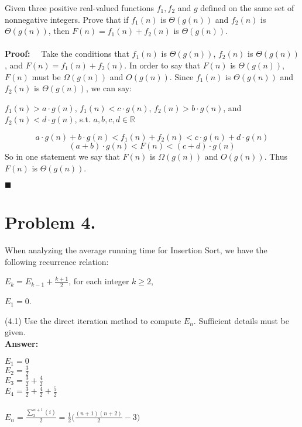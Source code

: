 \documentclass[11pt]{article}
\begin{document}
Given three positive real-valued functions $f_1,f_2$ and $g$ defined on the
same set of nonnegative integers.  Prove that if
$f_1(n)$ is $\Theta(g(n))$ and $f_2(n)$ is $\Theta(g(n))$, then
$F(n)=f_1(n)+f_2(n)$ is $\Theta(g(n))$.\\\\
\noindent
{\bf Proof:}~~ 
\newline
Take the conditions that $f_1(n)$ is $\Theta(g(n))$, $f_2(n)$ is $\Theta(g(n))$, and $F(n) = f_1(n) + f_2(n)$. In order to say that $F(n)$ is $\Theta(g(n))$, $F(n)$ must be $\Omega(g(n))$ and $O(g(n))$. Since $f_1(n)$ is $\Theta(g(n))$ and $f_2(n)$ is $\Theta(g(n))$, we can say: 
\begin{center}
    $f_1(n) > a\cdot g(n)$, $f_1(n) < c\cdot g(n)$, $f_2(n) > b\cdot g(n)$, and $f_2(n) < d\cdot g(n)$, s.t. $a,b,c,d \in \mathbb{R}$
\end{center}
\[a \cdot g(n) + b \cdot g(n) < f_1(n) + f_2(n) < c \cdot g(n) + d \cdot g(n)\]
\[(a+b) \cdot g(n) < F(n) < (c+d) \cdot g(n)\]
So in one statement we say that $F(n)$ is $\Omega (g(n))$ and $O(g(n))$. Thus $F(n)$ is $\Theta (g(n))$.
\begin{flushright}$\blacksquare$\end{flushright}
\newpage

\section*{Problem 4.}

When analyzing the average running time for Insertion Sort, we have the
following recurrence relation:

$E_k=E_{k-1}+\frac{k+1}{2}$, for each integer $k\geq 2$,

$E_1=0$.
\newline

(4.1) Use the direct iteration method to compute $E_n$. Sufficient details must be given.\\
\noindent
{\bf Answer:}~~ 
\newline

$E_1 = 0$\\
$E_2 = \frac{3}{2}$\\
$E_3 = \frac{3}{2} + \frac{4}{2}$\\
$E_4 = \frac{3}{2} + \frac{4}{2} + \frac{5}{2}$\\\\
\noindent
$E_n = \frac{\sum\limits^{n+1}_3 (i)}{2} = \frac{1}{2}\Big(\frac{(n+1)(n+2)}{2}-3\Big)$\\\\
\end{document}
